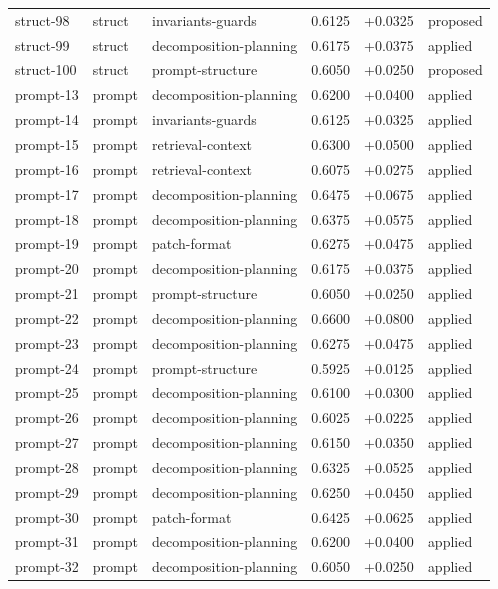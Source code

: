 \begin{center}
\begin{longtable}{llp{5.2cm}rrl}
struct-98 & struct & invariants-guards & 0.6125 & +0.0325 & proposed \\
struct-99 & struct & decomposition-planning & 0.6175 & +0.0375 & applied \\
struct-100 & struct & prompt-structure & 0.6050 & +0.0250 & proposed \\
prompt-13 & prompt & decomposition-planning & 0.6200 & +0.0400 & applied \\
prompt-14 & prompt & invariants-guards & 0.6125 & +0.0325 & applied \\
prompt-15 & prompt & retrieval-context & 0.6300 & +0.0500 & applied \\
prompt-16 & prompt & retrieval-context & 0.6075 & +0.0275 & applied \\
prompt-17 & prompt & decomposition-planning & 0.6475 & +0.0675 & applied \\
prompt-18 & prompt & decomposition-planning & 0.6375 & +0.0575 & applied \\
prompt-19 & prompt & patch-format & 0.6275 & +0.0475 & applied \\
prompt-20 & prompt & decomposition-planning & 0.6175 & +0.0375 & applied \\
prompt-21 & prompt & prompt-structure & 0.6050 & +0.0250 & applied \\
prompt-22 & prompt & decomposition-planning & 0.6600 & +0.0800 & applied \\
prompt-23 & prompt & decomposition-planning & 0.6275 & +0.0475 & applied \\
prompt-24 & prompt & prompt-structure & 0.5925 & +0.0125 & applied \\
prompt-25 & prompt & decomposition-planning & 0.6100 & +0.0300 & applied \\
prompt-26 & prompt & decomposition-planning & 0.6025 & +0.0225 & applied \\
prompt-27 & prompt & decomposition-planning & 0.6150 & +0.0350 & applied \\
prompt-28 & prompt & decomposition-planning & 0.6325 & +0.0525 & applied \\
prompt-29 & prompt & decomposition-planning & 0.6250 & +0.0450 & applied \\
prompt-30 & prompt & patch-format & 0.6425 & +0.0625 & applied \\
prompt-31 & prompt & decomposition-planning & 0.6200 & +0.0400 & applied \\
prompt-32 & prompt & decomposition-planning & 0.6050 & +0.0250 & applied \\

\end{longtable}
\end{center}
